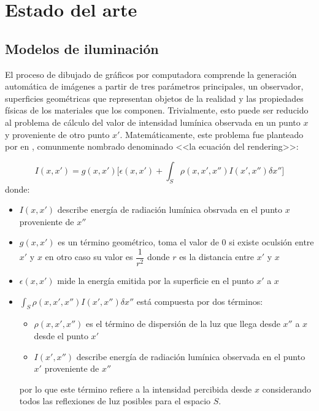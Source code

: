 \chapter{Estado del arte}
\label{ch:chap02}

\section{Modelos de iluminación}
\label{sec:dibujado}

El proceso de dibujado de gráficos por computadora comprende la generación automática de imágenes a partir de tres parámetros principales,
un observador, superficies geométricas que representan objetos de la realidad y las propiedades físicas de los materiales que los componen.
Trivialmente, esto puede ser reducido al problema de cálculo del valor de intensidad lumínica observada en un punto $x$ y proveniente de
otro punto $x'$. Matemáticamente, este problema fue planteado por \citeauthor{Kajiya} en \citeyear{Kajiya}, comunmente nombrado
denominado <<la ecuación del rendering>>:

\begin{equation}
    I(x,x') = g(x,x') \bigg[\epsilon(x,x') + \int_{S} \rho(x,x',x'')I(x',x'') \delta x''\bigg] \label{eq:rendering}
\end{equation}
donde:
\begin{itemize}
    \item $I(x,x')$ describe energía de radiación lumínica obsrvada en el punto $x$ proveniente de $x''$
    \item $g(x,x')$ es un término geométrico, toma el valor de $0$ si existe oculsión entre $x'$ y $x$ en otro caso su valor es $\dfrac{1}{r^{2}}$ donde $r$ es la distancia entre $x'$ y $x$
    \item $\epsilon(x,x')$ mide la energía emitida por la superficie en el punto $x'$ a $x$
    \item $\int_{S} \rho(x,x',x'')I(x',x'') \delta x''$ está compuesta por dos términos:
        \begin{itemize}
            \item $\rho(x,x',x'')$ es el término de dispersión de la luz que llega desde $x''$ a $x$ desde el punto $x'$
            \item $I(x',x'')$ describe energía de radiación lumínica observada en el punto $x'$ proveniente de $x''$
        \end{itemize}
    por lo que este término refiere a la intensidad percibida desde $x$ considerando todos las reflexiones de
    luz posibles para el espacio $S$.
\end{itemize}

